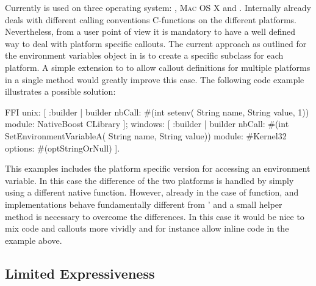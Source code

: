 Currently \NB is used on three operating system: \Linux, \textsc{Mac OS X} and \Windows.
Internally \NB already deals with different calling conventions C-functions on the different platforms.
Nevertheless, from a user point of view it is mandatory to have a well defined way to deal with platform specific \FFI callouts.
The current approach as outlined for the \PH \OS environment variables object in  is to create a specific subclass for each platform.
A simple extension to \NB to allow callout definitions for multiple platforms in a single method would greatly improve this case.
The following code example illustrates a possible solution:
%
\begin{stcode}[]{}
FFI 
  unix: [ :builder |
    builder 
      nbCall: #(int setenv(
                      String name, String value, 1))
      module: NativeBoost CLibrary ];
  windows: [ :builder |
    builder
      nbCall: #(int SetEnvironmentVariableA(
                      String name, String value))
      module: #Kernel32
      options: #(optStringOrNull) ].
\end{stcode}
%
This examples includes the platform specific version for accessing an environment variable.
In this case the difference of the two platforms is handled by simply using a different native function.
However, already in the case of  function, \Windows and \unix implementations behave fundamentally different from \Windows'  and a small \PH helper method is necessary to overcome the differences.
In this case it would be nice to mix \PH code and \FFI callouts more vividly and for instance allow inline \PH code in the example above.

\subsection{Limited Expressiveness}

